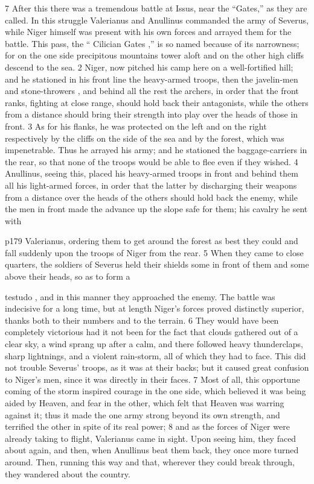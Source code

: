7
After this there was a tremendous battle at Issus, near the ``Gates,'' as they are called. In this struggle Valerianus and Anullinus commanded the army of Severus, while Niger himself was present with his own forces and arrayed them for the battle. This pass, the `` Cilician Gates ,'' is so named because of its narrowness; for on the one side precipitous mountains tower aloft and on the other high cliffs descend to the sea. 2 Niger, now pitched his camp here on a well-fortified hill; and he stationed in his front line the heavy-armed troops, then the javelin-men and stone-throwers , and behind all the rest the archers, in order that the front ranks, fighting at close range, should hold back their antagonists, while the others from a distance should bring their strength into play over the heads of those in front. 3 As for his flanks, he was protected on the left and on the right respectively by the cliffs on the side of the sea and by the forest, which was impenetrable. Thus he arrayed his army; and he stationed the baggage-carriers in the rear, so that none of the troops would be able to flee even if they wished. 4 Anullinus, seeing this, placed his heavy-armed troops in front and behind them all his light-armed forces, in order that the latter by discharging their weapons from a distance over the heads of the others should hold back the enemy, while the men in front made the advance up the slope safe for them; his cavalry he sent with

p179 Valerianus, ordering them to get around the forest as best they could and fall suddenly upon the troops of Niger from the rear. 5 When they came to close quarters, the soldiers of Severus held their shields some in front of them and some above their heads, so as to form a

testudo , and in this manner they approached the enemy. The battle was indecisive for a long time, but at length Niger's forces proved distinctly superior, thanks both to their numbers and to the terrain. 6 They would have been completely victorious had it not been for the fact that clouds gathered out of a clear sky, a wind sprang up after a calm, and there followed heavy thunderclaps, sharp lightnings, and a violent rain-storm, all of which they had to face. This did not trouble Severus' troops, as it was at their backs; but it caused great confusion to Niger's men, since it was directly in their faces. 7 Most of all, this opportune coming of the storm inspired courage in the one side, which believed it was being aided by Heaven, and fear in the other, which felt that Heaven was warring against it; thus it made the one army strong beyond its own strength, and terrified the other in spite of its real power; 8 and as the forces of Niger were already taking to flight, Valerianus came in sight. Upon seeing him, they faced about again, and then, when Anullinus beat them back, they once more turned around. Then, running this way and that, wherever they could break through, they wandered about the country.

